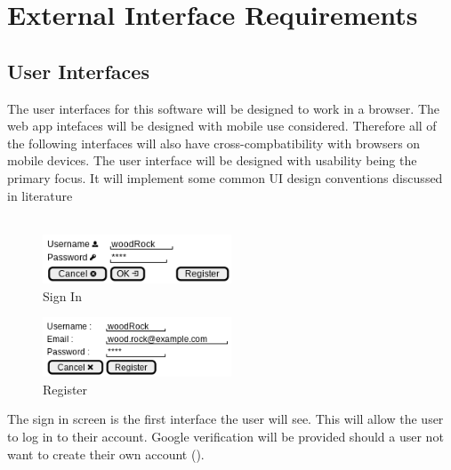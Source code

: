 \documentclass{article}
\newcommand{\comment}[1]{}
\begin{document}
\section{External Interface Requirements}
\subsection{User Interfaces}
\comment{
	Describe the logical characteristics of each interface between the software product and users. This may include smaple screen images, any GUI standards or product family style guides that are to be followed, screen layout contraints, standard buttons and functions (e.g., help) that will appear on every screen, keyboard shortcuts, error message display standards, and so on. Define the software components for which a user interface is needed. Details of the user interface should be documented in a seperate user interface specification.
	}
The user interfaces for this software will be designed to work in a browser. The web app intefaces will be designed with mobile use considered. Therefore all of the following interfaces will also have cross-compbatibility with browsers on mobile devices. The user interface will be designed with usability being the primary focus. It will implement some common UI design conventions discussed in literature \parencite{aboutface14}
\\ \\
\begin{figure}[H]\label{sign-in}
\caption{Sign In}
\centering
\includegraphics[width=0.5\textwidth]{sign-in.png}
\end{figure}
\begin{figure}[H]\label{register}
\caption{Register}
\centering 
\includegraphics[width=0.5\textwidth]{register.png}
\end{figure}
The sign in screen is the first interface the user will see. This will allow the user to log in to their account. Google verification will be provided should a user not want to create their own account ().
\\ \\
\end{document}
